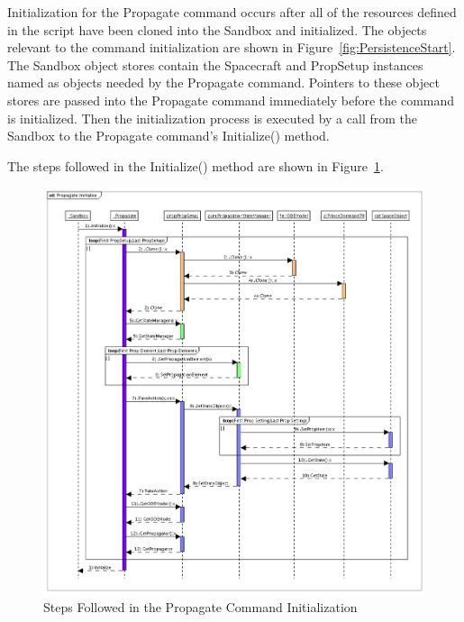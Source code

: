 \documentclass[10pt]{article}
\begin{document}
Initialization for the Propagate command occurs after all of the resources defined in the script have been cloned into the Sandbox and initialized.  The objects relevant to the command initialization are shown in Figure~\ref{fig:PersistenceStart}.  The Sandbox object stores contain the Spacecraft and PropSetup instances named as objects needed by the Propagate command.  Pointers to these object stores are passed into the Propagate command immediately before the command is initialized.  Then the initialization process is executed by a call from the Sandbox to the Propagate command's Initialize() method.

The steps followed in the Initialize() method are shown in Figure~\ref{fig:PropagateInitialize}.

\begin{figure}[p] 
   \centering
   \includegraphics[495,526]{Images/PropagateInitialize.png} 
   \caption{Steps Followed in the Propagate Command Initialization}
   \label{fig:PropagateInitialize}
\end{figure}
\end{document}
